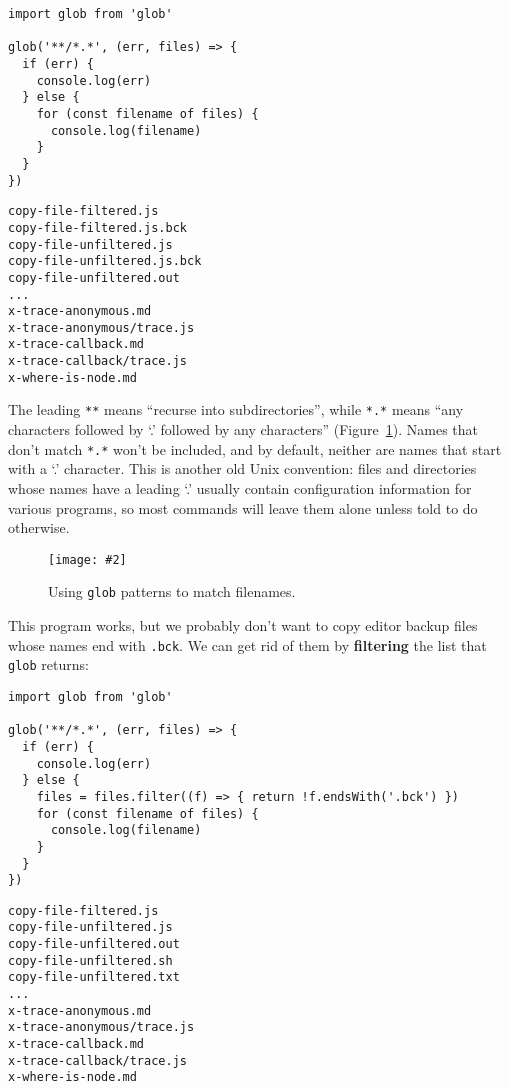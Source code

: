 \documentclass[krantzl]{krantz}
\newcommand{\figpdf}[4]{\begin{figure}%
\centering%
\texttt{[image: \#2]}%
\caption{#3}%
\label{#1}%
\end{figure}}
\newcommand{\figref}[1]{Figure~\ref{#1}}
\newcommand{\glossref}[1]{\textbf{#1}}
\begin{document}
\begin{lstlisting}[frame=tblr]
import glob from 'glob'

glob('**/*.*', (err, files) => {
  if (err) {
    console.log(err)
  } else {
    for (const filename of files) {
      console.log(filename)
    }
  }
})
\end{lstlisting}



\begin{lstlisting}[frame=tblr,backgroundcolor=\color{black!5}]
copy-file-filtered.js
copy-file-filtered.js.bck
copy-file-unfiltered.js
copy-file-unfiltered.js.bck
copy-file-unfiltered.out
...
x-trace-anonymous.md
x-trace-anonymous/trace.js
x-trace-callback.md
x-trace-callback/trace.js
x-where-is-node.md
\end{lstlisting}



The leading \texttt{**} means “recurse into subdirectories”,
while \texttt{*.*} means “any characters followed by ‘.’ followed by any characters”
(\figref{systems-programming-globbing}).
Names that don’t match \texttt{*.*} won’t be included,
and by default,
neither are names that start with a ‘.’ character.
This is another old Unix convention:
files and directories whose names have a leading ‘.’
usually contain configuration information for various programs,
so most commands will leave them alone unless told to do otherwise.

\figpdf{systems-programming-globbing}{./systems-programming/globbing.pdf}{Using \texttt{glob} patterns to match filenames.}{0.6}


This program works,
but we probably don’t want to copy editor backup files whose names end with \texttt{.bck}.
We can get rid of them by \glossref{filtering} the list that \texttt{glob} returns:


\newpage


\begin{lstlisting}[frame=tblr]
import glob from 'glob'

glob('**/*.*', (err, files) => {
  if (err) {
    console.log(err)
  } else {
    files = files.filter((f) => { return !f.endsWith('.bck') })
    for (const filename of files) {
      console.log(filename)
    }
  }
})
\end{lstlisting}



\begin{lstlisting}[frame=tblr,backgroundcolor=\color{black!5}]
copy-file-filtered.js
copy-file-unfiltered.js
copy-file-unfiltered.out
copy-file-unfiltered.sh
copy-file-unfiltered.txt
...
x-trace-anonymous.md
x-trace-anonymous/trace.js
x-trace-callback.md
x-trace-callback/trace.js
x-where-is-node.md
\end{lstlisting}
\end{document}
